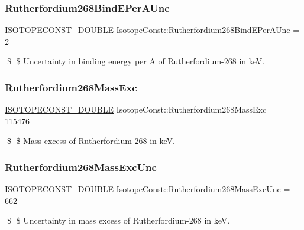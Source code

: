 \subsubsection{\texorpdfstring{Rutherfordium268\+Bind\+E\+Per\+A\+Unc}{Rutherfordium268BindEPerAUnc}}
{\footnotesize\ttfamily \mbox{\hyperlink{group___isotope_const-_macros_ga8f45a7272ce02c0b4c65c44636ed719a}{I\+S\+O\+T\+O\+P\+E\+C\+O\+N\+S\+T\+\_\+\+D\+O\+U\+B\+LE}} Isotope\+Const\+::\+Rutherfordium268\+Bind\+E\+Per\+A\+Unc = 2}

\$ \$ Uncertainty in binding energy per A of Rutherfordium-\/268 in keV. \mbox{\label{group___isotope_const-_rutherfordium-_rf268_gad30cd99b7f575f50e59961fb285950bb}} 
\subsubsection{\texorpdfstring{Rutherfordium268\+Mass\+Exc}{Rutherfordium268MassExc}}
{\footnotesize\ttfamily \mbox{\hyperlink{group___isotope_const-_macros_ga8f45a7272ce02c0b4c65c44636ed719a}{I\+S\+O\+T\+O\+P\+E\+C\+O\+N\+S\+T\+\_\+\+D\+O\+U\+B\+LE}} Isotope\+Const\+::\+Rutherfordium268\+Mass\+Exc = 115476}

\$ \$ Mass excess of Rutherfordium-\/268 in keV. \mbox{\label{group___isotope_const-_rutherfordium-_rf268_ga505bb68196fee7dcd1377af6b60bf6f3}} 
\subsubsection{\texorpdfstring{Rutherfordium268\+Mass\+Exc\+Unc}{Rutherfordium268MassExcUnc}}
{\footnotesize\ttfamily \mbox{\hyperlink{group___isotope_const-_macros_ga8f45a7272ce02c0b4c65c44636ed719a}{I\+S\+O\+T\+O\+P\+E\+C\+O\+N\+S\+T\+\_\+\+D\+O\+U\+B\+LE}} Isotope\+Const\+::\+Rutherfordium268\+Mass\+Exc\+Unc = 662}

\$ \$ Uncertainty in mass excess of Rutherfordium-\/268 in keV. \mbox{\label{group___isotope_const-_rutherfordium-_rf268_ga822ce4496854f3bbef0099f1af3bed20}} 
